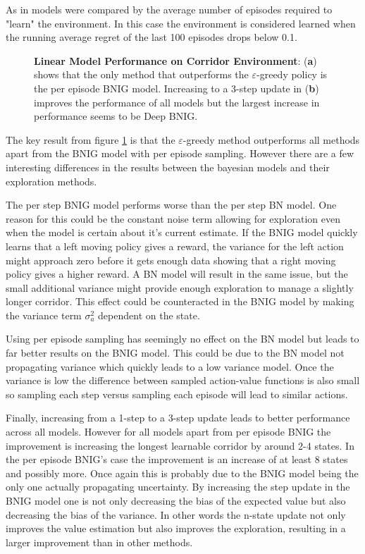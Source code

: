 As in \cite{osband_2018} models were compared by the average number of episodes required to "learn" the environment. In this case the environment is considered learned when the running average regret of the last 100 episodes drops below 0.1.

\begin{figure}[H]
    \centering
    \caption{\textbf{Linear Model Performance on Corridor Environment}: (\textbf{a}) shows that the only method that outperforms the $\varepsilon$-greedy policy is the per episode BNIG model. Increasing to a 3-step update in (\textbf{b}) improves the performance of all models but the largest increase in performance seems to be Deep BNIG.}
    \label{fig:linear_corridor}
\end{figure}

The key result from figure \ref{fig:linear_corridor} is that the $\varepsilon$-greedy method outperforms all methods apart from the BNIG model with per episode sampling. However there are a few interesting differences in the results between the bayesian models and their exploration methods. 

The per step BNIG model performs worse than the per step BN model. One reason for this could be the constant noise term allowing for exploration even when the model is certain about it's current estimate. If the BNIG model quickly learns that a left moving policy gives a reward, the variance for the left action might approach zero before it gets enough data showing that a right moving policy gives a higher reward. A BN model will result in the same issue, but the small additional variance might provide enough exploration to manage a slightly longer corridor. This effect could be counteracted in the BNIG model by making the variance term $\sigma_a^2$ dependent on the state.

Using per episode sampling has seemingly no effect on the BN model but leads to far better results on the BNIG model. This could be due to the BN model not propagating variance which quickly leads to a low variance model. Once the variance is low the difference between sampled action-value functions is also small so sampling each step versus sampling each episode will lead to similar actions.

Finally, increasing from a 1-step to a 3-step update leads to better performance across all models. However for all models apart from per episode BNIG the improvement is increasing the longest learnable corridor by around 2-4 states. In the per episode BNIG's case the improvement is an increase of at least 8 states and possibly more. Once again this is probably due to the BNIG model being the only one actually propagating uncertainty. By increasing the step update in the BNIG model one is not only decreasing the bias of the expected value but also decreasing the bias of the variance. In other words the n-state update not only improves the value estimation but also improves the exploration, resulting in a larger improvement than in other methods.


